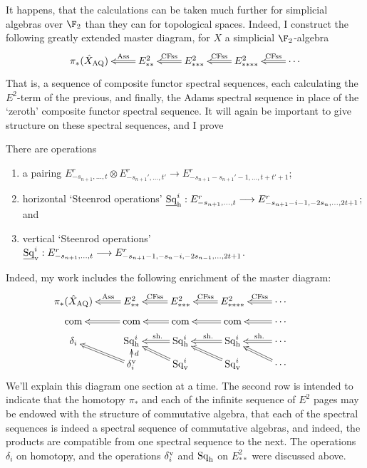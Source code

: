 \documentclass[11pt]{article}
\newcommand{\Sq}{\mathrm{Sq}}
\begin{document}
It happens, that the calculations can be taken much further for simplicial algebras over $\F_2$ than they can for topological spaces. Indeed, I construct the following greatly extended master diagram, for $X$ a simplicial $\F_2$-algebra
\[\xymatrix@R=4mm{
\pi_{*}(\hat X_\textup{AQ})&%
\ar@{=>}[l]_-{\textup{Ass}}
E^2_{**}&%
\ar@{=>}[l]_-{\textup{CFss}}
E^2_{***}
&%
E^2_{****}
\ar@{=>}[l]_-{\textup{CFss}}&%
\cdots
\ar@{=>}[l]_-{\textup{CFss}}%
}\]
That is, a sequence of composite functor spectral sequences, each calculating the $E^2$-term of the previous, and finally, the Adams spectral sequence in place of the `zeroth' composite functor spectral sequence. It will again be important to give structure on these spectral sequences, and I prove
\begin{thm}
There are operations
\begin{enumerate}\squishlist
\setlength{\parindent}{.25in}
\item a pairing $E^r_{-s_{n+1},\ldots,t}\otimes E^r_{-s_{n+1}',\ldots,t'}\to E^r_{-s_{n+1}-s_{n+1}'-1,\ldots,t+t'+1}$;
\item horizontal `Steenrod operations' $\underline{\Sq}^i_\textup{h}:E^r_{-s_{n+1},\ldots,t}\to E^r_{-s_{n+1}-i-1,-2s_{n},\ldots,2t+1}$; and
\item vertical `Steenrod operations' $\underline{\Sq}^i_\textup{v}:E^r_{-s_{n+1},\ldots,t}\to E^r_{-s_{n+1}-1,-s_{n}-i,-2s_{n-1},\ldots,2t+1}$.
\end{enumerate}


\end{thm}
Indeed, my work includes the following enrichment of the master diagram:
\[\xymatrix@R=2mm{
\pi_{*}(\hat X_\textup{AQ})&%
\ar@{=>}[l]_-{\textup{Ass}}
E^2_{**}&%
\ar@{=>}[l]_-{\textup{CFss}}
E^2_{***}
&%
E^2_{****}
\ar@{=>}[l]_-{\textup{CFss}}&%
\cdots
\ar@{=>}[l]_-{\textup{CFss}}%
\\
\textup{com}&
\textup{com}\ar@{=>}[l]&
\textup{com}\ar@{=>}[l]&
\textup{com}\ar@{=>}[l]&
\cdots \ar@{=>}[l]\\
\delta_i&
\Sq^i_\textup{h}&
\Sq^i_\textup{h}\ar@{=>}[l]_-{\ \textup{sh.}}&
\Sq^i_\textup{h}\ar@{=>}[l]_-{\ \textup{sh.}}&
\cdots \ar@{=>}[l]_-{\ \textup{sh.}}\\
&
\delta^\textup{v}_i\ar@{=>}[ul]\ar[u]_-d
&
\Sq_\textup{v}^i\ar@{=>}[ul]&
\Sq_\textup{v}^i\ar@{=>}[ul]&
\cdots \ar@{=>}[ul]&
}\]
We'll explain this diagram one section at a time. The second row is intended to indicate that the homotopy $\pi_*$ and each of the infinite sequence of $E^2$ pages may be endowed with the structure of commutative algebra, that each of the spectral sequences is indeed a spectral sequence of commutative algebras, and indeed, the products are compatible from one spectral sequence to the next. The operations $\delta_i$ on homotopy, and the operations $\delta_i^\textup{v}$ and $\Sq_\textup{h}$ on $E^2_{**}$ were discussed above.
\end{document}
